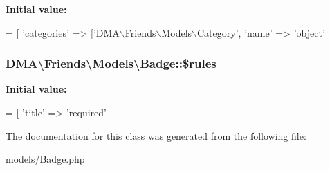 {\bfseries Initial value\+:}
\begin{DoxyCode}
= [
        \textcolor{stringliteral}{'categories'}    => [\textcolor{stringliteral}{'DMA\(\backslash\)Friends\(\backslash\)Models\(\backslash\)Category'}, \textcolor{stringliteral}{'name'} => \textcolor{stringliteral}{'object'}
\end{DoxyCode}
\hypertarget{classDMA_1_1Friends_1_1Models_1_1Badge_ab750ee2c75af273ca930a12b1a20b3ae}{
\subsubsection[{\$rules}]{\setlength{\rightskip}{0pt plus 5cm}D\+M\+A\textbackslash{}\+Friends\textbackslash{}\+Models\textbackslash{}\+Badge\+::\$rules}}\label{classDMA_1_1Friends_1_1Models_1_1Badge_ab750ee2c75af273ca930a12b1a20b3ae}
{\bfseries Initial value\+:}
\begin{DoxyCode}
= [ 
        \textcolor{stringliteral}{'title'} => \textcolor{stringliteral}{'required'}
\end{DoxyCode}


The documentation for this class was generated from the following file\+:\begin{DoxyCompactItemize}
\item 
models/Badge.\+php\end{DoxyCompactItemize}
